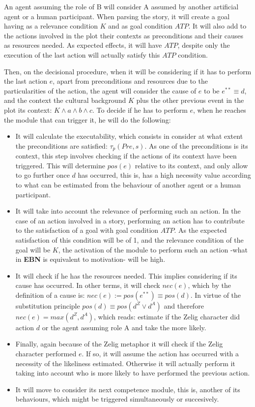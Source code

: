 \documentclass[
		twoside,openright,titlepage,numbers=noenddot,manychapters,
		headinclude,%
                footinclude=false,cleardoublepage=empty,
                BCOR=5mm,
		fontsize=11pt, %
                 enabledeprecatedfontcommands]{scrreprt}
\begin{document}
An agent assuming the role of B will consider A assumed by another artificial agent or a human participant. When parsing the story, it will create a goal having as a relevance condition $K$ and as goal condition $ATP$. It will also add to the actions involved in the plot their contexts as preconditions and their causes as resources needed. As expected effects, it will have $ATP$, despite only the execution of the last action will actually satisfy this $ATP$ condition.

Then, on the decisional procedure, when it will be considering if it has to perform the last action $e$, apart from preconditions and resources due to the particularities of the action, the agent will consider the cause of $e$ to be $e^{**} \equiv d$, and the context the cultural background $K$ plus the other previous event in the plot its context: $K \wedge a \wedge b \wedge c $. To decide if he has to perform $e$, when he reaches the module that can trigger it, he will do the following:  
\begin{itemize}
	\item  It will calculate the executability, which consists in consider at what extent the preconditions are satisfied: $\tau_p(Pre,s)$. As one of the preconditions is its context, this step involves checking if the actions of its context have been triggered. This will determine $pos(e)$ relative to its context, and only allow to go further once $d$ has occurred, this is, has a high necessity value according to what can be estimated from the behaviour of another agent or a human participant.
	
	\item It will take into account the relevance of performing such an action. In the case of an action involved in a story, performing an action has to contribute to the satisfaction of a goal with goal condition $ATP$. As the expected satisfaction of this condition will be of 1, and the relevance condition of the goal will be $K$, the activation of the module to perform such an action -what in \textbf{EBN} is equivalent to motivation- will be high.  
	
	\item It will check if he has the resources needed. This implies considering if its cause has occurred. In other terms, it will check $nec(e)$, which by the definition of a cause is: $ nec(e) := pos(e^{**})\equiv pos(d)$. In virtue of the substitution principle $pos(d)\equiv pos(d^Z \vee d^A)$ and therefore $nec(e) = max (d^Z, d^A)$, which reads: estimate if the Zelig character did action $d$ or the agent assuming role A and take the more likely. 
	\item  Finally, again because of the Zelig metaphor it will check if the Zelig character performed $e$. If so, it will assume the action has occurred with a necessity of the likeliness estimated. Otherwise it will actually perform it taking into account who is more likely to have performed the previous action. 
 \item  It will move to consider its next competence module, this is, another of its behaviours, which might be triggered simultaneously or succesively.

\end{itemize}
\end{document}
